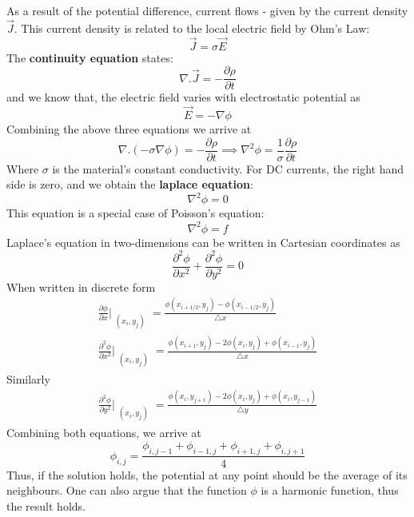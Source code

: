 \documentclass[12pt, a4paper]{report}
\begin{document}
As a result of the potential difference, current flows - given by the current density $\overrightarrow{J}$. This current density is related to the local electric field by Ohm’s Law:
\begin{equation*}
\overrightarrow{J} = \sigma \overrightarrow{E}
\end{equation*}
The \textbf{continuity equation} states:
\begin{equation*}
\nabla.\overrightarrow{J} = -\frac{\partial\rho}{\partial t}
\end{equation*}
and we know that, the electric field varies with electrostatic potential as
\begin{equation*}
\overrightarrow{E} = -\nabla\phi
\end{equation*}
Combining the above three equations we arrive at
\begin{equation*}
\nabla.(-\sigma\nabla\phi) = -\frac{\partial\rho}{\partial t}
\implies \nabla^2\phi = \frac{1}{\sigma}\frac{\partial\rho}{\partial t} 
\end{equation*}
Where $\sigma$ is the material's constant conductivity. For DC currents, the right hand side is zero, and we obtain the \textbf{laplace equation}:
\begin{equation*}
\nabla^2\phi = 0
\end{equation*}
This equation is a special case of Poisson's equation: 
\begin{equation*}
\nabla^2\phi = f
\end{equation*}
Laplace's equation in two-dimensions can  be written in Cartesian coordinates as 
\begin{equation*}
\frac{\partial^2 \phi}{\partial x^2} + \frac{\partial^2 \phi}{\partial y^2} = 0
\end{equation*}
When written in discrete form
 \begin{align*}
 \frac{\partial \phi}{\partial x}\Bigr|_{\substack{(x_i,y_j)}} = \frac{\phi(x_{i+1/2},y_j) - \phi(x_{i-1/2},y_j)}{\triangle x} \\
 \frac{\partial^2 \phi}{\partial x^2}\Bigr|_{\substack{(x_i,y_j)}} = \frac{\phi(x_{i+1},y_j) -2\phi(x_i,y_j) +\phi(x_{i-1},y_j)}{\triangle x} 
 \end{align*}
 Similarly
\begin{align*}
\frac{\partial^2 \phi}{\partial y^2}\Bigr|_{\substack{(x_i,y_j)}} = \frac{\phi(x_i,y_{j+1}) -2\phi(x_i,y_j) +\phi(x_i,y_{j-1})}{\triangle y}
 \end{align*}
Combining both equations, we arrive at
\begin{equation*}
\phi_{i,j} = \frac{\phi_{i,j-1}+\phi_{i-1,j}+\phi_{i+1,j}+\phi_{i,j+1}}{4} 
\end{equation*}
Thus, if the solution holds, the potential at any point should be the average of its neighbours. One can also argue that the function $\phi$ is a harmonic function, thus the result holds. 
\end{document}
